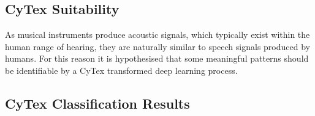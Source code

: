 \subsection{CyTex Suitability}
As musical instruments produce acoustic signals, which typically exist within the human range of hearing, they are naturally similar to speech signals produced by humans. For this reason it is hypothesised that some meaningful patterns should be identifiable by a CyTex transformed deep learning process. 

\subsection{CyTex Classification Results}

